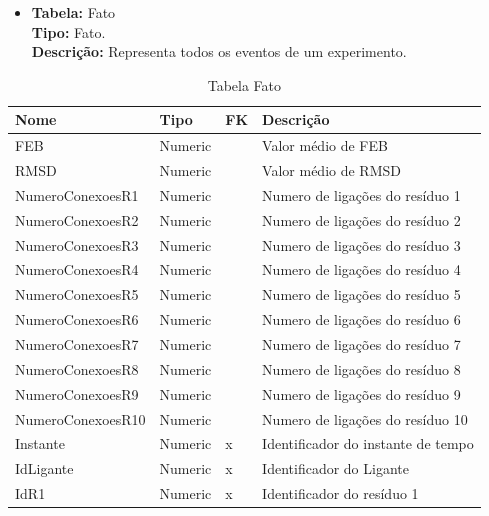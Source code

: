 \begin{itemize}
	\item
		\textbf{Tabela:} Fato \\
		\textbf{Tipo:} Fato. \\
		\textbf{Descrição:} Representa todos os eventos de um experimento.
\end{itemize}
\begin{table}[!htbp]
	\caption{Tabela Fato}
	\centering
	\begin{tabular}{@{}llll@{}}
	\toprule
	\textbf{Nome} & \textbf{Tipo} & \textbf{FK} & \textbf{Descrição}           				\\ \midrule
	FEB            			 & Numeric        &             & Valor médio de FEB			    \\
	RMSD    				 & Numeric        &             & Valor médio de RMSD          		\\
	NumeroConexoesR1 	     & Numeric        &             & Numero de ligações do resíduo 1   \\
	NumeroConexoesR2 	     & Numeric        &             & Numero de ligações do resíduo 2   \\
	NumeroConexoesR3 	     & Numeric        &             & Numero de ligações do resíduo 3   \\
	NumeroConexoesR4 	     & Numeric        &             & Numero de ligações do resíduo 4   \\
	NumeroConexoesR5 	     & Numeric        &             & Numero de ligações do resíduo 5   \\
	NumeroConexoesR6 	     & Numeric        &             & Numero de ligações do resíduo 6   \\
	NumeroConexoesR7 	     & Numeric        &             & Numero de ligações do resíduo 7   \\
	NumeroConexoesR8 	     & Numeric        &             & Numero de ligações do resíduo 8   \\
	NumeroConexoesR9 	     & Numeric        &             & Numero de ligações do resíduo 9   \\
	NumeroConexoesR10 	     & Numeric        &             & Numero de ligações do resíduo 10  \\
	Instante 	    		 & Numeric        &  x          & Identificador do instante de tempo  \\
	IdLigante 	    		 & Numeric        &  x          & Identificador do Ligante 			\\
	IdR1 				     & Numeric        &  x          & Identificador do resíduo 1   	\\

\end{tabular}
\end{table}
